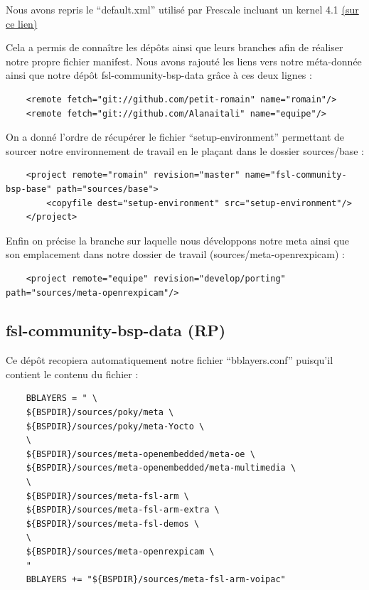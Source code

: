 Nous avons repris le “default.xml” utilisé par Frescale incluant un kernel 4.1
\href{http://git.freescale.com/git/cgit.cgi/imx/fsl-arm-yocto-bsp.git/tree/default.xml?h=imx-4.1-krogoth}
{(sur ce lien)}

Cela a permis de connaître les dépôts ainsi que leurs branches afin de réaliser notre
propre fichier manifest. Nous avons rajouté les liens vers notre méta-donnée ainsi que
notre dépôt fsl-community-bsp-data grâce à ces deux lignes : \medskip

\begin{lstlisting}
    <remote fetch="git://github.com/petit-romain" name="romain"/>
    <remote fetch="git://github.com/Alanaitali" name="equipe"/>    
\end{lstlisting}

On a donné l’ordre de récupérer le fichier “setup-environment” permettant de sourcer notre
environnement de travail en le plaçant dans le dossier sources/base : \medskip 

\begin{lstlisting}
    <project remote="romain" revision="master" name="fsl-community-bsp-base" path="sources/base">
        <copyfile dest="setup-environment" src="setup-environment"/>
    </project>
\end{lstlisting}

Enfin on précise la branche sur laquelle nous développons notre meta ainsi que son
emplacement dans notre dossier de travail (sources/meta-openrexpicam) :

\begin{lstlisting}
    <project remote="equipe" revision="develop/porting" path="sources/meta-openrexpicam"/>
\end{lstlisting}

\subsection{fsl-community-bsp-data (RP)}

Ce dépôt recopiera automatiquement notre fichier “bblayers.conf” puisqu’il
contient le contenu du fichier : 

\begin{lstlisting}
    BBLAYERS = " \
    ${BSPDIR}/sources/poky/meta \
    ${BSPDIR}/sources/poky/meta-Yocto \
    \
    ${BSPDIR}/sources/meta-openembedded/meta-oe \
    ${BSPDIR}/sources/meta-openembedded/meta-multimedia \
    \
    ${BSPDIR}/sources/meta-fsl-arm \
    ${BSPDIR}/sources/meta-fsl-arm-extra \
    ${BSPDIR}/sources/meta-fsl-demos \
    \
    ${BSPDIR}/sources/meta-openrexpicam \
    "
    BBLAYERS += "${BSPDIR}/sources/meta-fsl-arm-voipac"
\end{lstlisting}

